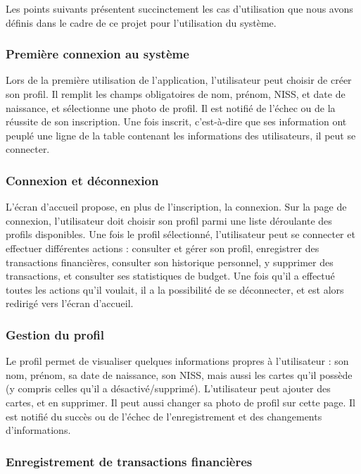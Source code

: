 \documentclass[a4paper,12pt]{article}
\begin{document}
Les points suivants présentent succinctement les cas d'utilisation que nous avons définis dans le cadre de ce projet pour l'utilisation du système.

\subsubsection{Première connexion au système}

Lors de la première utilisation de l'application, l'utilisateur peut choisir de créer son profil.
Il remplit les champs obligatoires de nom, prénom, NISS, et date de naissance, et sélectionne une photo de profil.
Il est notifié de l'échec ou de la réussite de son inscription.
Une fois inscrit, c'est-à-dire que ses information ont peuplé une ligne de la table contenant les informations des utilisateurs, il peut se connecter.

\subsubsection{Connexion et déconnexion}

L'écran d'accueil propose, en plus de l'inscription, la connexion.
Sur la page de connexion, l'utilisateur doit choisir son profil parmi une liste déroulante des profils disponibles.
Une fois le profil sélectionné, l'utilisateur peut se connecter et effectuer différentes actions : consulter et gérer son profil, enregistrer des transactions financières, consulter son historique personnel, y supprimer des transactions, et consulter ses statistiques de budget.
Une fois qu'il a effectué toutes les actions qu'il voulait, il a la possibilité de se déconnecter, et est alors redirigé vers l'écran d'accueil.

\subsubsection{Gestion du profil}

Le profil permet de visualiser quelques informations propres à l'utilisateur : son nom, prénom, sa date de naissance, son NISS, mais aussi les cartes qu'il possède (y compris celles qu'il a désactivé/supprimé).
L'utilisateur peut ajouter des cartes, et en supprimer.
Il peut aussi changer sa photo de profil sur cette page.
Il est notifié du succès ou de l'échec de l'enregistrement et des changements d'informations.

\subsubsection{Enregistrement de transactions financières}
\end{document}
